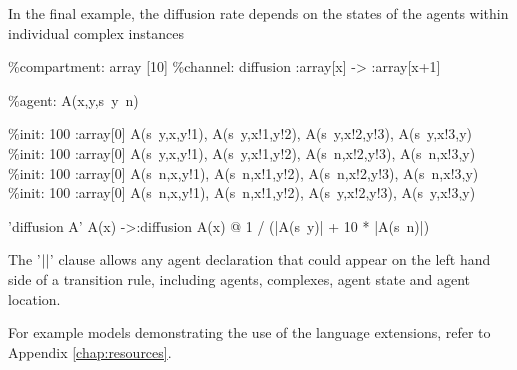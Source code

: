 In the final example, the diffusion rate depends on the states of the agents within individual complex instances

\begin{kappasource}
\%compartment: array [10]
\%channel: diffusion :array[x] -> :array[x+1]

\%agent: A(x,y,s~y~n)

\%init: 100 :array[0] A(s~y,x,y!1), A(s~y,x!1,y!2), A(s~y,x!2,y!3), A(s~y,x!3,y)
\%init: 100 :array[0] A(s~y,x,y!1), A(s~y,x!1,y!2), A(s~n,x!2,y!3), A(s~n,x!3,y)
\%init: 100 :array[0] A(s~n,x,y!1), A(s~n,x!1,y!2), A(s~n,x!2,y!3), A(s~n,x!3,y)
\%init: 100 :array[0] A(s~n,x,y!1), A(s~n,x!1,y!2), A(s~y,x!2,y!3), A(s~y,x!3,y)

'diffusion A' A(x) ->:diffusion A(x) @ 1 / (|A(s~y)| + 10 * |A(s~n)|)
\end{kappasource}

The '$\arrowvert\arrowvert$' clause allows any agent declaration that could appear on the left hand side of a transition rule, including agents, complexes, agent state and agent location.


\bigskip For example models demonstrating the use of the language extensions, refer to Appendix \ref{chap:resources}.

\newpage
